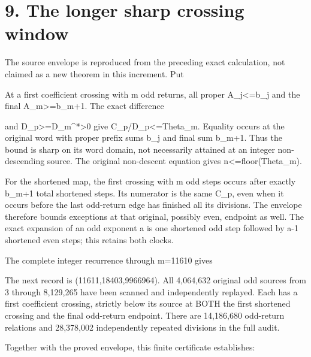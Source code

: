 \section{9. The longer sharp crossing window}

The source envelope is reproduced from the preceding exact calculation,
not claimed as a new theorem in this increment. Put


At a first coefficient crossing with m odd returns, all proper
A\_j\textless=b\_j and the final A\_m\textgreater=b\_m+1. The exact
difference


and D\_p\textgreater=D\_m\^{}*\textgreater0 give
C\_p/D\_p\textless=Theta\_m. Equality occurs at the original word with
proper prefix sums b\_j and final sum b\_m+1. Thus the bound is sharp on
its word domain, not necessarily attained at an integer non-descending
source. The original non-descent equation gives
n\textless=floor(Theta\_m).

For the shortened map, the first crossing with m odd steps occurs after
exactly b\_m+1 total shortened steps. Its numerator is the same C\_p,
even when it occurs before the last odd-return edge has finished all its
divisions. The envelope therefore bounds exceptions at that original,
possibly even, endpoint as well. The exact expansion of an odd exponent
a is one shortened odd step followed by a-1 shortened even steps; this
retains both clocks.

The complete integer recurrence through m=11610 gives


The next record is (11611,18403,9966964). All 4,064,632 original odd
sources from 3 through 8,129,265 have been scanned and independently
replayed. Each has a first coefficient crossing, strictly below its
source at BOTH the first shortened crossing and the final odd-return
endpoint. There are 14,186,680 odd-return relations and 28,378,002
independently repeated divisions in the full audit.

Together with the proved envelope, this finite certificate establishes:

